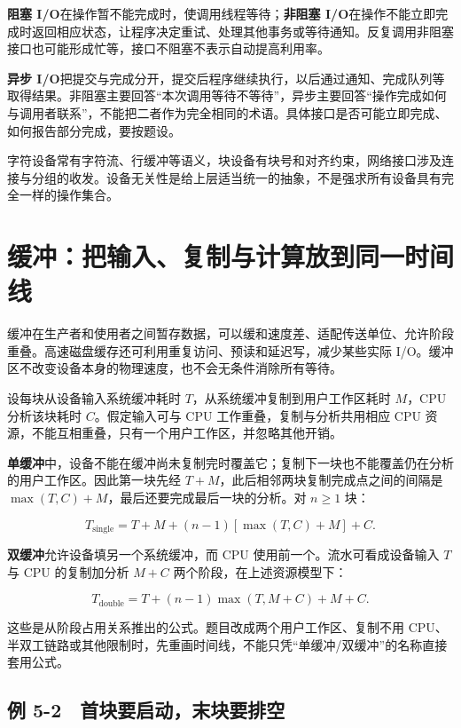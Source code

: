 \textbf{阻塞 I/O}在操作暂不能完成时，使调用线程等待；\textbf{非阻塞 I/O}在操作不能立即完成时返回相应状态，让程序决定重试、处理其他事务或等待通知。反复调用非阻塞接口也可能形成忙等，接口不阻塞不表示自动提高利用率。

\textbf{异步 I/O}把提交与完成分开，提交后程序继续执行，以后通过通知、完成队列等取得结果。非阻塞主要回答``本次调用等待不等待''，异步主要回答``操作完成如何与调用者联系''，不能把二者作为完全相同的术语。具体接口是否可能立即完成、如何报告部分完成，要按题设。

字符设备常有字符流、行缓冲等语义，块设备有块号和对齐约束，网络接口涉及连接与分组的收发。设备无关性是给上层适当统一的抽象，不是强求所有设备具有完全一样的操作集合。

\section{缓冲：把输入、复制与计算放到同一时间线}\label{OS05-7-5}

缓冲在生产者和使用者之间暂存数据，可以缓和速度差、适配传送单位、允许阶段重叠。高速磁盘缓存还可利用重复访问、预读和延迟写，减少某些实际 I/O。缓冲区不改变设备本身的物理速度，也不会无条件消除所有等待。

设每块从设备输入系统缓冲耗时 \(T\)，从系统缓冲复制到用户工作区耗时 \(M\)，CPU 分析该块耗时 \(C\)。假定输入可与 CPU 工作重叠，复制与分析共用相应 CPU 资源，不能互相重叠，只有一个用户工作区，并忽略其他开销。

\textbf{单缓冲}中，设备不能在缓冲尚未复制完时覆盖它；复制下一块也不能覆盖仍在分析的用户工作区。因此第一块先经 \(T+M\)，此后相邻两块复制完成点之间的间隔是 \(\max(T,C)+M\)，最后还要完成最后一块的分析。对 \(n\ge1\) 块：

\[T_{\mathrm{single}}=T+M+(n-1)[\max(T,C)+M]+C.\]

\textbf{双缓冲}允许设备填另一个系统缓冲，而 CPU 使用前一个。流水可看成设备输入 \(T\) 与 CPU 的复制加分析 \(M+C\) 两个阶段，在上述资源模型下：

\[T_{\mathrm{double}}=T+(n-1)\max(T,M+C)+M+C.\]

这些是从阶段占用关系推出的公式。题目改成两个用户工作区、复制不用 CPU、半双工链路或其他限制时，先重画时间线，不能只凭``单缓冲/双缓冲''的名称直接套用公式。

\subsection{例 5-2　首块要启动，末块要排空}\label{OS05-ex7-2}

